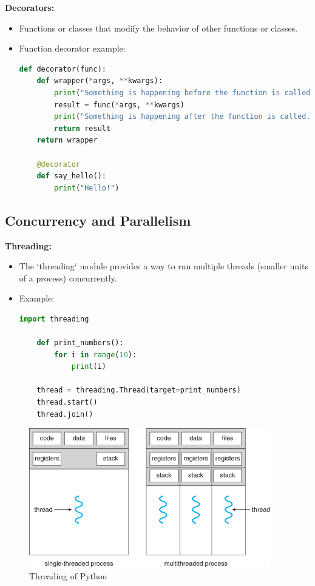 \documentclass[12pt]{article}
\begin{document}
\textbf{Decorators:}
\begin{itemize}
    \item Functions or classes that modify the behavior of other functions or classes.
    \item Function decorator example:\\
    \begin{lstlisting}[language = Python]
    def decorator(func):
    def wrapper(*args, **kwargs):
        print("Something is happening before the function is called.")
        result = func(*args, **kwargs)
        print("Something is happening after the function is called.")
        return result
    return wrapper

    @decorator
    def say_hello():
        print("Hello!")
    \end{lstlisting}
    
\end{itemize}

\subsection{Concurrency and Parallelism}

\textbf{Threading:}
\begin{itemize}
    \item The `threading` module provides a way to run multiple threads (smaller units of a process) concurrently.
    \item Example:\\
    \begin{lstlisting}[language = Python]
    import threading

    def print_numbers():
        for i in range(10):
            print(i)
    
    thread = threading.Thread(target=print_numbers)
    thread.start()
    thread.join()
    \end{lstlisting}
    
\end{itemize}

\begin{figure}[h!]
\begin{center}
\includegraphics[width=10.5cm]{advanced1.jpg}\\
Threading of Python
\end{center}
\end{figure}
\end{document}
